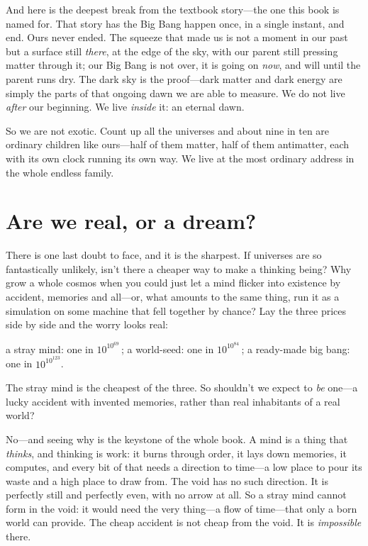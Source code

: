 And here is the deepest break from the textbook story---the one this book is named
for. That story has the Big Bang happen once, in a single instant, and end. Ours
never ended. The squeeze that made us is not a moment in our past but a surface
still \emph{there}, at the edge of the sky, with our parent still pressing matter
through it; our Big Bang is not over, it is going on \emph{now}, and will until the
parent runs dry. The dark sky is the proof---dark matter and dark energy are simply
the parts of that ongoing dawn we are able to measure. We do not live \emph{after}
our beginning. We live \emph{inside} it: an eternal dawn.

So we are not exotic. Count up all the universes and about nine in ten are
ordinary children like ours---half of them matter, half of them antimatter, each
with its own clock running its own way. We live at the most ordinary address in
the whole endless family.

\section*{Are we real, or a dream?}

There is one last doubt to face, and it is the sharpest. If universes are so
fantastically unlikely, isn't there a cheaper way to make a thinking being? Why
grow a whole cosmos when you could just let a mind flicker into existence by
accident, memories and all---or, what amounts to the same thing, run it as a
simulation on some machine that fell together by chance? Lay the three prices side
by side and the worry looks real:

\begin{center}
a stray mind: one in $10^{10^{69}}$\,;\qquad
a world-seed: one in $10^{10^{84}}$\,;\qquad
a ready-made big bang: one in $10^{10^{123}}$.
\end{center}

\noindent The stray mind is the cheapest of the three. So shouldn't we expect to
\emph{be} one---a lucky accident with invented memories, rather than real
inhabitants of a real world?

No---and seeing why is the keystone of the whole book. A mind is a thing that
\emph{thinks}, and thinking is work: it burns through order, it lays down
memories, it computes, and every bit of that needs a direction to time---a low
place to pour its waste and a high place to draw from. The void has no such
direction. It is perfectly still and perfectly even, with no arrow at all. So a
stray mind cannot form in the void: it would need the very thing---a flow of
time---that only a born world can provide. The cheap accident is not cheap from
the void. It is \emph{impossible} there.

